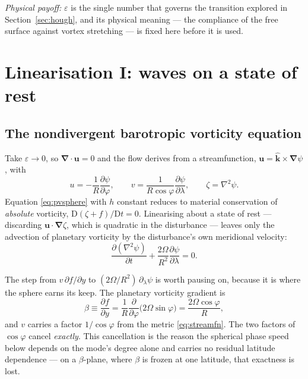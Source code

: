 \documentclass[11pt,a4paper]{article}
\newcommand{\D}{\mathrm{D}}
\newcommand{\uvec}{\boldsymbol{u}}
\newcommand{\kvec}{\hat{\boldsymbol{k}}}
\newcommand{\grad}{\boldsymbol{\nabla}}
\begin{document}
\medskip
\noindent\emph{Physical payoff:} $\varepsilon$ is the single number that governs
the transition explored in Section~\ref{sec:hough}, and its physical meaning ---
the compliance of the free surface against vortex stretching --- is fixed here
before it is used.

\section{Linearisation I: waves on a state of rest}
\label{sec:rest}

\subsection{The nondivergent barotropic vorticity equation}

Take $\varepsilon\to 0$, so $\grad\!\cdot\uvec = 0$ and the flow derives from a
streamfunction, $\uvec = \kvec\times\grad\psi$, with
%
\begin{equation}
u = -\frac{1}{R}\frac{\partial\psi}{\partial\varphi},
\qquad
v = \frac{1}{R\cos\varphi}\frac{\partial\psi}{\partial\lambda},
\qquad
\zeta = \nabla^2\psi .
\label{eq:streamfn}
\end{equation}
%
Equation \eqref{eq:pvsphere} with $h$ constant reduces to material conservation
of \emph{absolute} vorticity, $\D(\zeta+f)/\D t = 0$. Linearising about a state
of rest --- discarding $\uvec\!\cdot\!\grad\zeta$, which is quadratic in the
disturbance --- leaves only the advection of planetary vorticity by the
disturbance's own meridional velocity:
%
\begin{equation}
\frac{\partial (\nabla^2\psi)}{\partial t}
 + \frac{2\Omega}{R^2}\frac{\partial\psi}{\partial\lambda} = 0 .
\label{eq:bve}
\end{equation}

The step from $v\,\partial f/\partial y$ to $(2\Omega/R^2)\,\partial_\lambda\psi$
is worth pausing on, because it is where the sphere earns its keep. The
planetary vorticity gradient is
%
\begin{equation}
\beta \equiv \frac{\partial f}{\partial y}
 = \frac{1}{R}\frac{\partial}{\partial\varphi}\big(2\Omega\sin\varphi\big)
 = \frac{2\Omega\cos\varphi}{R} ,
\label{eq:beta}
\end{equation}
%
and $v$ carries a factor $1/\cos\varphi$ from the metric \eqref{eq:streamfn}.
The two factors of $\cos\varphi$ cancel \emph{exactly}. This cancellation is the
reason the spherical phase speed below depends on the mode's degree alone and
carries no residual latitude dependence --- on a $\beta$-plane, where $\beta$ is
frozen at one latitude, that exactness is lost.
\end{document}
